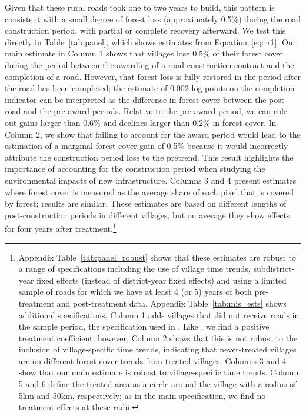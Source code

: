 Given that these rural roads took one to two years to build, this
pattern is consistent with a small degree of forest loss
(approximately 0.5\%) during the road construction period, with
partial or complete recovery afterward. We test this directly in
Table~\ref{tab:panel}, which shows estimates from
Equation~\ref{eq:rr1}. Our main estimate in Column 1 shows that
villages lose 0.5\% of their forest cover during the period between
the awarding of a road construction contract and the completion of a
road. However, that forest loss is fully restored in the period after
the road has been completed; the estimate of 0.002 log points on the
completion indicator can be interpreted as the difference in forest
cover between the post-road and the pre-award periods. Relative to the
pre-award period, we can rule out gains larger than 0.6\% and declines
larger than 0.2\% in forest cover. In Column 2, we show that failing
to account for the award period would lead to the estimation of a
marginal forest cover gain of 0.5\% because it would incorrectly
attribute the construction period loss to the pretrend. This result
highlights the importance of accounting for the construction period
when studying the environmental impacts of new infrastructure. Columns
3 and 4 present estimates where forest cover is measured as the
average share of each pixel that is covered by forest; results are
similar.  These estimates are based on different lengths of
post-construction periods in different villages, but on average they
show effects for four years after treatment.\footnote{Appendix
  Table~\ref{tab:panel_robust} shows that these estimates are robust
  to a range of specifications including the use of village time
  trends, subdistrict-year fixed effects (instead of district-year
  fixed effects) and using a limited sample of roads for which we have
  at least 4 (or 5) years of both pre-treatment and post-treatment
  data. Appendix Table~\ref{tab:mis_ests} shows additional
  specifications. Column 1 adds villages that did not receive roads in
  the sample period, the specification used in . Like
  , we find a positive treatment coefficient; however,
  Column 2 shows that this is not robust to the inclusion of
  village-specific time trends, indicating that never-treated villages
  are on different forest cover trends from treated villages. Columns 3
  and 4 show that our main estimate is robust to village-specific time
  trends. Column 5 and 6 define the treated area as a circle around
  the village with a radius of 5km and 50km, respectively; as in the main
  specification, we find no treatment effects at these radii.}


